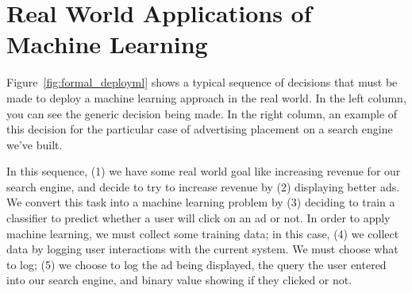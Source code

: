 

\section{Real World Applications of Machine Learning}

Figure~\ref{fig:formal_deployml} shows a typical sequence of decisions that must be made to deploy a machine learning approach in the real world. In the left column, you can see the generic decision being made. In the right column, an example of this decision for the particular case of advertising placement on a search engine we've built.

In this sequence, (1) we have some real world goal like increasing revenue for our search engine, and decide to try to increase revenue by (2) displaying better ads. We convert this task into a machine learning problem by (3) deciding to train a classifier to predict whether a user will click on an ad or not. In order to apply machine learning, we must collect some training data; in this case, (4) we collect data by logging user interactions with the current system. We must choose what to log; (5) we choose to log the ad being displayed, the query the user entered into our search engine, and binary value showing if they clicked or not.

